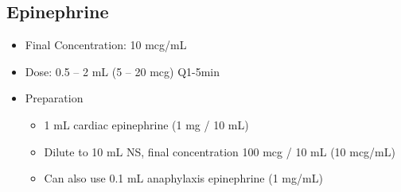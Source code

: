 \documentclass[main.tex]{subfiles}
\begin{document}
\subsection{Epinephrine}
\begin{itemize}[noitemsep]
	\item Final Concentration: 10 \si{mcg/mL}
	\item Dose: 0.5 -- 2 \si{mL} (5 -- 20 \si{mcg}) Q1-5min
	\item Preparation
	\begin{itemize}[noitemsep]
		\item 1 \si{mL} cardiac epinephrine (1 \si{mg} / 10 \si{mL})
		\item Dilute to 10 \si{mL} NS, final concentration 100 \si{mcg} / 10 \si{mL} (10 \si{mcg/mL})
		\item Can also use 0.1 \si{mL} anaphylaxis epinephrine (1 \si{mg/mL})
	\end{itemize}
\end{itemize}



\printmybib
\end{document}
